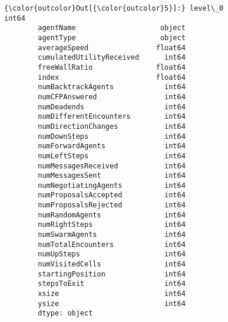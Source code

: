 \documentclass[11pt]{article}
\begin{document}
\begin{Verbatim}[commandchars=\\\{\}]
{\color{outcolor}Out[{\color{outcolor}5}]:} level\_0                       int64
        agentName                    object
        agentType                    object
        averageSpeed                float64
        cumulatedUtilityReceived      int64
        freeWallRatio               float64
        index                       float64
        numBacktrackAgents            int64
        numCFPAnswered                int64
        numDeadends                   int64
        numDifferentEncounters        int64
        numDirectionChanges           int64
        numDownSteps                  int64
        numForwardAgents              int64
        numLeftSteps                  int64
        numMessagesReceived           int64
        numMessagesSent               int64
        numNegotiatingAgents          int64
        numProposalsAccepted          int64
        numProposalsRejected          int64
        numRandomAgents               int64
        numRightSteps                 int64
        numSwarmAgents                int64
        numTotalEncounters            int64
        numUpSteps                    int64
        numVisitedCells               int64
        startingPosition              int64
        stepsToExit                   int64
        xsize                         int64
        ysize                         int64
        dtype: object
\end{Verbatim}
            
\end{document}
